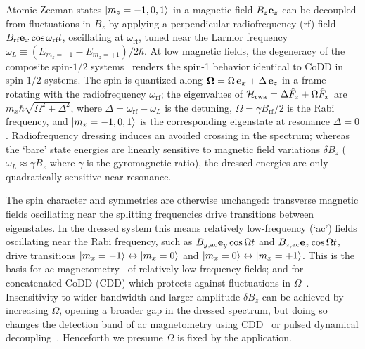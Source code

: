 \documentclass[aps,prl,reprint,superscriptaddress,floatfix]{revtex4-1}
\begin{document}
Atomic Zeeman states $\vert m_z=-1,0,1 \rangle $ in a magnetic field $B_z \mathbf{e}_z$ can be decoupled from fluctuations in $B_z$ by applying a perpendicular radiofrequency (rf) field $B_{\text{rf}} \mathbf{e}_x \cos \omega_\text{rf} t$, oscillating at $\omega_\text{rf}$, tuned near the Larmor frequency $\omega_L \equiv (E_{m_z=-1}-E_{m_z=+1})/2\hbar$.
At low magnetic fields, the degeneracy of the composite spin-$1/2$ systems~\cite{majorana_atomi_1932} renders the spin-1 behavior identical to CoDD in spin-$1/2$ systems.
The spin is quantized along $\mathbf{\Omega} = \Omega \, \mathbf{e}_x + \Delta \, \mathbf{e}_z$ in a frame rotating with the radiofrequency $\omega_{\text{rf}}$; the eigenvalues of $\mathcal{H}_{\text{rwa}} = \Delta \hat{F}_z + \Omega \hat{F}_x$ are $m_x \hbar \sqrt{\Omega^2 + \Delta^2}$, where $\Delta = \omega_{\text{rf}}-\omega_L$ is the detuning, $\Omega = \gamma B_{\text{rf}} / 2$ is the Rabi frequency, and $\vert m_x=-1,0,1 \rangle $ is the corresponding eigenstate at resonance $\Delta=0$.
Radiofrequency dressing induces an avoided crossing in the spectrum; whereas the `bare' state energies are linearly sensitive to magnetic field variations $\delta B_z$ ($\omega_L \approx \gamma B_z$ where $\gamma$ is the gyromagnetic ratio), the dressed energies are only quadratically sensitive near resonance.

The spin character and symmetries are otherwise unchanged: transverse magnetic fields oscillating near the splitting frequencies drive transitions between eigenstates.
In the dressed system this means relatively low-frequency (`ac') fields oscillating near the Rabi frequency, such as $B_{y,\text{ac}} \mathbf{e}_y \cos \Omega t$ and $B_{z,\text{ac}} \mathbf{e}_z \cos \Omega t$, drive transitions $\vert m_x=-1 \rangle  \leftrightarrow \vert m_x=0 \rangle $ and $\vert m_x=0 \rangle  \leftrightarrow \vert m_x=+1 \rangle $.
This is the basis for ac magnetometry~\cite{hirose_continuous_2012} of relatively low-frequency fields; and for concatenated CoDD (CDD) which protects against fluctuations in $\Omega$~\cite{cai_robust_2012}.
Insensitivity to wider bandwidth and larger amplitude $\delta B_z$ can be achieved by increasing $\Omega$, opening a broader gap in the dressed spectrum, but doing so changes the detection band of ac magnetometry using CDD~\cite{loretz_radio-frequency_2013} or pulsed dynamical decoupling~\cite{boss_quantum_2017,*schmitt_submillihertz_2017}.
Henceforth we presume $\Omega$ is fixed by the application.~
\end{document}
